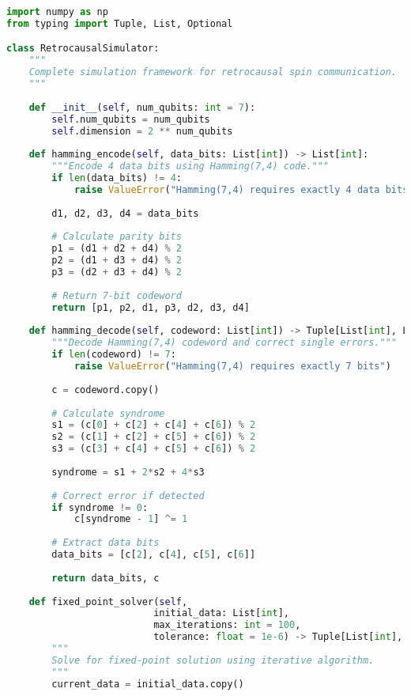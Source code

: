 \documentclass[12pt,a4paper]{article}
\begin{document}
\begin{lstlisting}[language=Python, caption=Complete Simulation Framework]
import numpy as np
from typing import Tuple, List, Optional

class RetrocausalSimulator:
    """
    Complete simulation framework for retrocausal spin communication.
    """
    
    def __init__(self, num_qubits: int = 7):
        self.num_qubits = num_qubits
        self.dimension = 2 ** num_qubits
        
    def hamming_encode(self, data_bits: List[int]) -> List[int]:
        """Encode 4 data bits using Hamming(7,4) code."""
        if len(data_bits) != 4:
            raise ValueError("Hamming(7,4) requires exactly 4 data bits")
            
        d1, d2, d3, d4 = data_bits
        
        # Calculate parity bits
        p1 = (d1 + d2 + d4) % 2
        p2 = (d1 + d3 + d4) % 2
        p3 = (d2 + d3 + d4) % 2
        
        # Return 7-bit codeword
        return [p1, p2, d1, p3, d2, d3, d4]
    
    def hamming_decode(self, codeword: List[int]) -> Tuple[List[int], List[int]]:
        """Decode Hamming(7,4) codeword and correct single errors."""
        if len(codeword) != 7:
            raise ValueError("Hamming(7,4) requires exactly 7 bits")
            
        c = codeword.copy()
        
        # Calculate syndrome
        s1 = (c[0] + c[2] + c[4] + c[6]) % 2
        s2 = (c[1] + c[2] + c[5] + c[6]) % 2
        s3 = (c[3] + c[4] + c[5] + c[6]) % 2
        
        syndrome = s1 + 2*s2 + 4*s3
        
        # Correct error if detected
        if syndrome != 0:
            c[syndrome - 1] ^= 1
            
        # Extract data bits
        data_bits = [c[2], c[4], c[5], c[6]]
        
        return data_bits, c
    
    def fixed_point_solver(self, 
                          initial_data: List[int], 
                          max_iterations: int = 100,
                          tolerance: float = 1e-6) -> Tuple[List[int], List[int], bool]:
        """
        Solve for fixed-point solution using iterative algorithm.
        """
        current_data = initial_data.copy()
        

\end{lstlisting}
\end{document}
